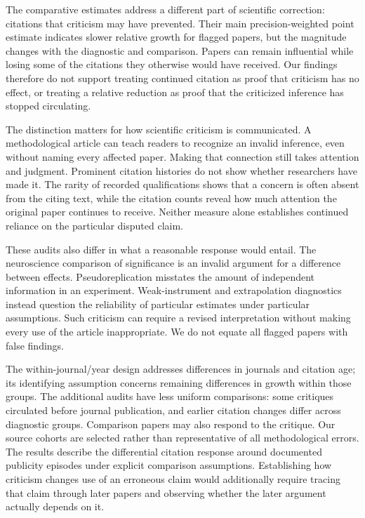 \documentclass[11pt,letterpaper]{article}
\begin{document}
The comparative estimates address a different part of scientific correction: citations that criticism may have prevented. Their main precision-weighted point estimate indicates slower relative growth for flagged papers, but the magnitude changes with the diagnostic and comparison. Papers can remain influential while losing some of the citations they otherwise would have received. Our findings therefore do not support treating continued citation as proof that criticism has no effect, or treating a relative reduction as proof that the criticized inference has stopped circulating.

The distinction matters for how scientific criticism is communicated. A methodological article can teach readers to recognize an invalid inference, even without naming every affected paper. Making that connection still takes attention and judgment. Prominent citation histories do not show whether researchers have made it. The rarity of recorded qualifications shows that a concern is often absent from the citing text, while the citation counts reveal how much attention the original paper continues to receive. Neither measure alone establishes continued reliance on the particular disputed claim.

These audits also differ in what a reasonable response would entail. The neuroscience comparison of significance is an invalid argument for a difference between effects. Pseudoreplication misstates the amount of independent information in an experiment. Weak-instrument and extrapolation diagnostics instead question the reliability of particular estimates under particular assumptions. Such criticism can require a revised interpretation without making every use of the article inappropriate. We do not equate all flagged papers with false findings.

The within-journal/year design addresses differences in journals and citation age; its identifying assumption concerns remaining differences in growth within those groups. The additional audits have less uniform comparisons: some critiques circulated before journal publication, and earlier citation changes differ across diagnostic groups. Comparison papers may also respond to the critique. Our source cohorts are selected rather than representative of all methodological errors. The results describe the differential citation response around documented publicity episodes under explicit comparison assumptions. Establishing how criticism changes use of an erroneous claim would additionally require tracing that claim through later papers and observing whether the later argument actually depends on it.
\end{document}
